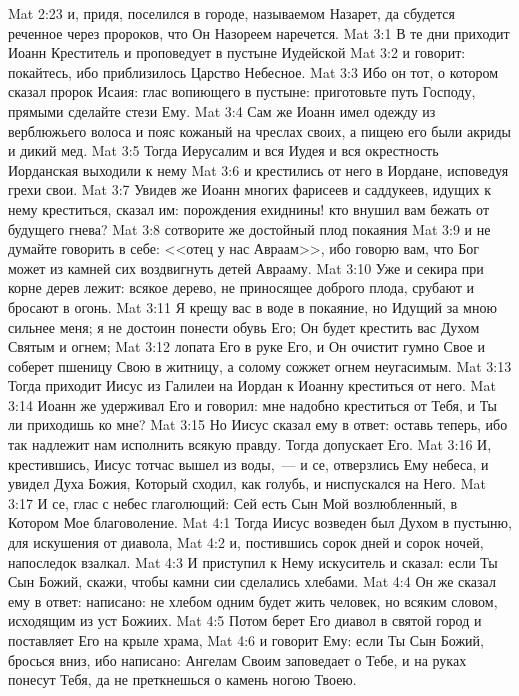 \vs Mat 2:23 и, придя, поселился в городе, называемом Назарет, да сбудется реченное через пророков, что Он Назореем наречется.
\vs Mat 3:1 В те дни приходит Иоанн Креститель и проповедует в пустыне Иудейской
\vs Mat 3:2 и говорит: покайтесь, ибо приблизилось Царство Небесное.
\vs Mat 3:3 Ибо он тот, о котором сказал пророк Исаия: глас вопиющего в пустыне: приготовьте путь Господу, прямыми сделайте стези Ему.
\vs Mat 3:4 Сам же Иоанн имел одежду из верблюжьего волоса и пояс кожаный на чреслах своих, а пищею его были акриды и дикий мед.
\vs Mat 3:5 Тогда Иерусалим и вся Иудея и вся окрестность Иорданская выходили к нему
\vs Mat 3:6 и крестились от него в Иордане, исповедуя грехи свои.
\vs Mat 3:7 Увидев же Иоанн многих фарисеев и саддукеев, идущих к нему креститься, сказал им: порождения ехиднины! кто внушил вам бежать от будущего гнева?
\vs Mat 3:8 сотворите же достойный плод покаяния
\vs Mat 3:9 и не думайте говорить в себе: <<отец у нас Авраам>>, ибо говорю вам, что Бог может из камней сих воздвигнуть детей Аврааму.
\vs Mat 3:10 Уже и секира при корне дерев лежит: всякое дерево, не приносящее доброго плода, срубают и бросают в огонь.
\vs Mat 3:11 Я крещу вас в воде в покаяние, но Идущий за мною сильнее меня; я не достоин понести обувь Его; Он будет крестить вас Духом Святым и огнем;
\vs Mat 3:12 лопата Его в руке Его, и Он очистит гумно Свое и соберет пшеницу Свою в житницу, а солому сожжет огнем неугасимым.
\rsbpar\vs Mat 3:13 Тогда приходит Иисус из Галилеи на Иордан к Иоанну креститься от него.
\vs Mat 3:14 Иоанн же удерживал Его и говорил: мне надобно креститься от Тебя, и Ты ли приходишь ко мне?
\vs Mat 3:15 Но Иисус сказал ему в ответ: оставь теперь, ибо так надлежит нам исполнить всякую правду. Тогда  допускает Его.
\vs Mat 3:16 И, крестившись, Иисус тотчас вышел из воды,~--- и се, отверзлись Ему небеса, и увидел  Духа Божия, Который сходил, как голубь, и ниспускался на Него.
\vs Mat 3:17 И се, глас с небес глаголющий: Сей есть Сын Мой возлюбленный, в Котором Мое благоволение.
\vs Mat 4:1 Тогда Иисус возведен был Духом в пустыню, для искушения от диавола,
\vs Mat 4:2 и, постившись сорок дней и сорок ночей, напоследок взалкал.
\vs Mat 4:3 И приступил к Нему искуситель и сказал: если Ты Сын Божий, скажи, чтобы камни сии сделались хлебами.
\vs Mat 4:4 Он же сказал ему в ответ: написано: не хлебом одним будет жить человек, но всяким словом, исходящим из уст Божиих.
\vs Mat 4:5 Потом берет Его диавол в святой город и поставляет Его на крыле храма,
\vs Mat 4:6 и говорит Ему: если Ты Сын Божий, бросься вниз, ибо написано: Ангелам Своим заповедает о Тебе, и на руках понесут Тебя, да не преткнешься о камень ногою Твоею.
